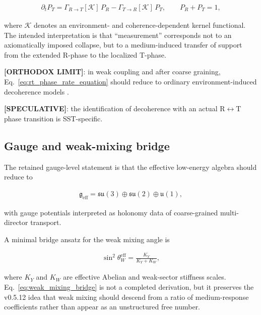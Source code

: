 \documentclass[11pt]{article}
\theoremstyle{definition}
\theoremstyle{plain}
\theoremstyle{remark}
\begin{document}
        \begin{align}
            \partial_t P_T
            =
            \Gamma_{R\to T}[\mathcal{K}]\,P_R
            -
            \Gamma_{T\to R}[\mathcal{K}]\,P_T,
            \qquad
            P_R + P_T = 1,
            \label{eq:rt_phase_rate_equation}
        \end{align}

        where $\mathcal{K}$ denotes an environment- and coherence-dependent kernel functional. The intended interpretation is that ``measurement'' corresponds not to an axiomatically imposed collapse, but to a medium-induced transfer of support from the extended R-phase to the localized T-phase.

        \textbf{[ORTHODOX LIMIT]}: in weak coupling and after coarse graining, Eq.~\eqref{eq:rt_phase_rate_equation} should reduce to ordinary environment-induced decoherence models \cite{Zurek2003}.

        \textbf{[SPECULATIVE]}: the identification of decoherence with an actual R$\leftrightarrow$T phase transition is SST-specific.

    \subsection{Gauge and weak-mixing bridge}
        \label{subsec:gauge_weakmix_bridge}

        The retained gauge-level statement is that the effective low-energy algebra should reduce to

        \begin{align}
            \mathfrak{g}_{\mathrm{eff}} = \mathfrak{su}(3)\oplus\mathfrak{su}(2)\oplus\mathfrak{u}(1),
            \label{eq:effective_gauge_algebra}
        \end{align}

        with gauge potentials interpreted as holonomy data of coarse-grained multi-director transport.

        A minimal bridge ansatz for the weak mixing angle is

        \begin{align}
            \sin^2\theta_W^{\mathrm{eff}} = \frac{K_Y}{K_Y + K_W},
            \label{eq:weak_mixing_bridge}
        \end{align}

        where $K_Y$ and $K_W$ are effective Abelian and weak-sector stiffness scales. Eq.~\eqref{eq:weak_mixing_bridge} is not a completed derivation, but it preserves the v0.5.12 idea that weak mixing should descend from a ratio of medium-response coefficients rather than appear as an unstructured free number.
\end{document}
